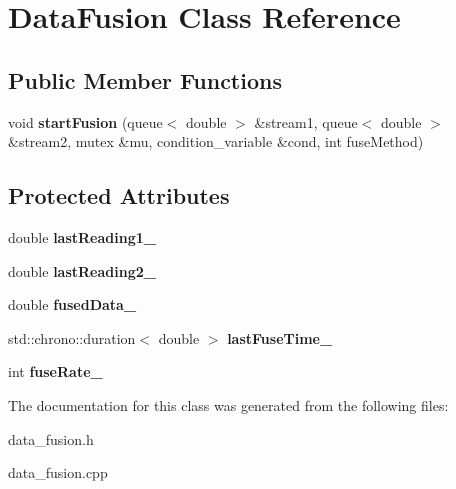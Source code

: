 \hypertarget{classDataFusion}{}\section{Data\+Fusion Class Reference}
\label{classDataFusion}
\subsection*{Public Member Functions}
\begin{DoxyCompactItemize}
\item 
void {\bfseries start\+Fusion} (queue$<$ double $>$ \&stream1, queue$<$ double $>$ \&stream2, mutex \&mu, condition\+\_\+variable \&cond, int fuse\+Method)\hypertarget{classDataFusion_aa4afcc1feff6fdf9688d95ad640154cd}{}\label{classDataFusion_aa4afcc1feff6fdf9688d95ad640154cd}

\end{DoxyCompactItemize}
\subsection*{Protected Attributes}
\begin{DoxyCompactItemize}
\item 
double {\bfseries last\+Reading1\+\_\+}\hypertarget{classDataFusion_adf9b71d9520833a171900b7979210be1}{}\label{classDataFusion_adf9b71d9520833a171900b7979210be1}

\item 
double {\bfseries last\+Reading2\+\_\+}\hypertarget{classDataFusion_a3f4a0f8cdaaa4aa04bacb77aca0373d6}{}\label{classDataFusion_a3f4a0f8cdaaa4aa04bacb77aca0373d6}

\item 
double {\bfseries fused\+Data\+\_\+}\hypertarget{classDataFusion_a5dcf6bb23b44f3a5a953a4fdc5ec7579}{}\label{classDataFusion_a5dcf6bb23b44f3a5a953a4fdc5ec7579}

\item 
std\+::chrono\+::duration$<$ double $>$ {\bfseries last\+Fuse\+Time\+\_\+}\hypertarget{classDataFusion_a851740c7f918b3ec4195be061f8f275d}{}\label{classDataFusion_a851740c7f918b3ec4195be061f8f275d}

\item 
int {\bfseries fuse\+Rate\+\_\+}\hypertarget{classDataFusion_a4c036eccb8ed9b1a86ede0682e543704}{}\label{classDataFusion_a4c036eccb8ed9b1a86ede0682e543704}

\end{DoxyCompactItemize}


The documentation for this class was generated from the following files\+:\begin{DoxyCompactItemize}
\item 
data\+\_\+fusion.\+h\item 
data\+\_\+fusion.\+cpp\end{DoxyCompactItemize}
